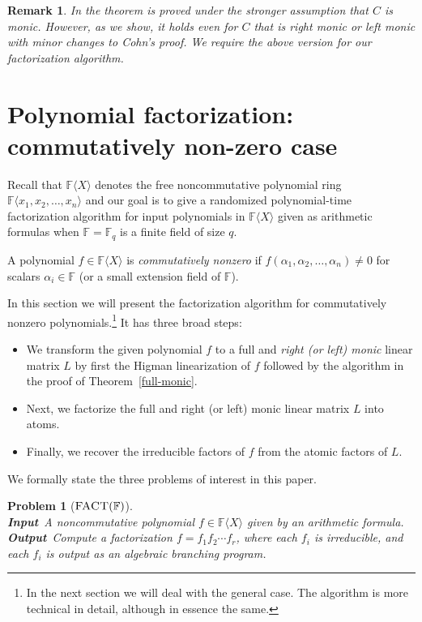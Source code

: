 \documentclass[10pt,a4paper]{article}
\newtheorem{remark}[theorem]{Remark}
\newtheorem{problem}[theorem]{Problem}
\newcommand{\F}{\mathbb{F}}
\renewcommand{\angle}[1]{\langle #1 \rangle}
\newcommand{\FX}{\F\angle{X}}
\newcommand{\fR}{\FX}
\newcommand{\prob}[1]{\textsc{#1}}
\begin{document}
\begin{remark}
  In \cite{Cohnfir} the theorem is proved under the stronger
  assumption that $C$ is monic. However, as we show, it holds even for
  $C$ that is right monic or left monic with minor changes to Cohn's
  proof. We require the above version for our factorization algorithm.
\end{remark}

%
%
%
%


\section{Polynomial factorization: commutatively non-zero case}\label{cnz-sec}

Recall that $\fR$ denotes the free noncommutative polynomial ring
$\F\angle{x_1,x_2,\ldots,x_n}$ and our goal is to give a randomized
polynomial-time factorization algorithm for input polynomials in $\fR$
given as arithmetic formulas when $\F=\F_q$ is a finite field of size
$q$.

A polynomial $f\in\fR$ is \emph{commutatively nonzero} if
$f(\alpha_1,\alpha_2,\ldots,\alpha_n)\ne 0$ for scalars $\alpha_i\in
\F$ (or a small extension field of $\F$).

In this section we will present the factorization algorithm for
commutatively nonzero polynomials.\footnote{In the next section we
  will deal with the general case. The algorithm is more technical in
  detail, although in essence the same.}  It has three broad steps:
\begin{itemize}
\item[(i)] We transform the given polynomial $f$ to a full and \emph{right (or left)
  monic} linear matrix $L$ by first the Higman linearization of $f$
  followed by the algorithm in the proof of Theorem~\ref{full-monic}.
\item[(ii)] Next, we factorize the full and right (or left) monic linear matrix $L$
  into atoms.
\item[(iii)] Finally, we recover the irreducible factors of $f$ from
  the atomic factors of $L$.
\end{itemize}  

We formally state the three problems of interest in this paper.

\begin{problem}[$\prob{FACT}(\F)$]\hfill{~}\\
\textbf{Input}~A noncommutative polynomial $f\in\FX$ given by an
arithmetic formula.\\
\textbf{Output}~Compute a factorization
$f=f_1f_2\cdots f_r$, where each $f_i$ is irreducible, and each $f_i$
is output as an algebraic branching program.
\end{problem}
\end{document}
